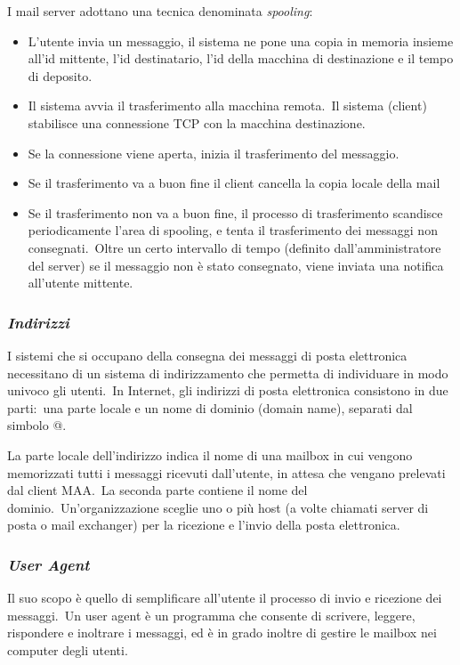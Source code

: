 I mail server adottano una tecnica denominata \emph{spooling}:
\begin{itemize}
    \item L'utente invia un messaggio, il sistema ne pone una copia in memoria insieme all'id mittente, l'id destinatario, l'id della macchina di destinazione e il tempo di deposito.
    \item Il sistema avvia il trasferimento alla macchina remota.\
          Il sistema (cli\-ent) stabilisce una connessione TCP con la macchina destinazione.
    \item Se la connessione viene aperta, inizia il trasferimento del messaggio.
    \item Se il trasferimento va a buon fine il client cancella la copia locale della mail
    \item Se il trasferimento non va a buon fine, il processo di trasferimento scandisce periodicamente l'area di spooling, e tenta il trasferimento dei messaggi non consegnati.\
          Oltre un certo intervallo di tempo (definito dall'amministratore del server) se il messaggio non è stato consegnato, viene inviata una notifica all'utente mittente.
\end{itemize}

\subsubsection{\emph{Indirizzi}}

I sistemi che si occupano della consegna dei messaggi di posta elettronica necessitano di un sistema di indirizzamento che permetta di individuare in modo univoco gli utenti.\
In Internet, gli indirizzi di posta elettronica consistono in due parti:\ una parte locale e un nome di dominio (domain name), separati dal simbolo @.

La parte locale dell'indirizzo indica il nome di una mailbox in cui vengono memorizzati tutti i messaggi ricevuti dall'utente, in attesa che vengano prelevati dal client MAA.\
La seconda parte contiene il nome del dominio.\
Un'organizzazione sceglie uno o più host (a volte chiamati server di posta o mail exchanger) per la ricezione e l'invio della posta elettronica.

\subsubsection{\emph{User Agent}}

Il suo scopo è quello di semplificare all'utente il processo di invio e ricezione dei messaggi.\
Un user agent è un programma che consente di scrivere, leggere, rispondere e inoltrare i messaggi, ed è in grado inoltre di gestire le mailbox nei computer degli utenti.

